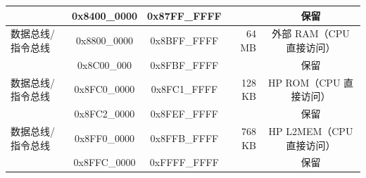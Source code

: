 \begin{ThreePartTable}
\begin{longtable}[c]{|p{3.5cm}|c|c|r|c| }
        \rowcolor{gray!25}  & 0x8400\_0000 & 0x87FF\_FFFF &         & 保留      \\\hline
        {数据总线/指令总线} & 0x8800\_0000 & 0x8BFF\_FFFF & 64 MB  & 外部 RAM（CPU 直接访问） \\\hline
        \rowcolor{gray!25}  & 0x8C00\_000 & 0x8FBF\_FFFF &         & 保留      \\\hline
        {数据总线/指令总线} & 0x8FC0\_0000 & 0x8FC1\_FFFF & 128 KB  & HP ROM（CPU 直接访问） \\\hline
        \rowcolor{gray!25}  & 0x8FC2\_0000 & 0x8FEF\_FFFF &         & 保留      \\\hline
        {数据总线/指令总线} & 0x8FF0\_0000 & 0x8FFB\_FFFF & 768 KB  & HP L2MEM（CPU 直接访问）\\\hline
        \rowcolor{gray!25}  & 0x8FFC\_0000 & 0xFFFF\_FFFF &         & 保留      \\\hline
\end{longtable}
\end{ThreePartTable}